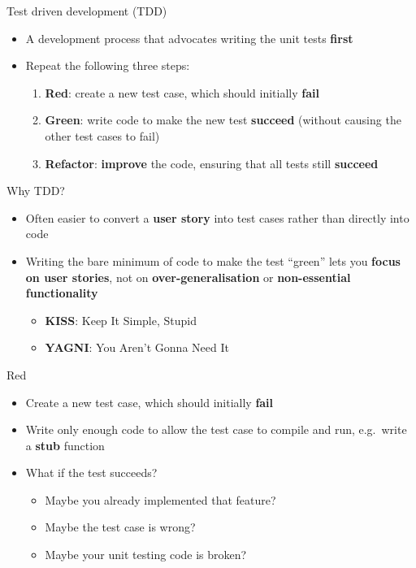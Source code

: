 \begin{frame}{Test driven development (TDD)}
    \begin{itemize}
        \item A development process that advocates writing the unit tests \textbf{first} \pause
        \item Repeat the following three steps: \pause
            \begin{enumerate}
                \item \textbf{Red}: create a new test case, which should initially \textbf{fail} \pause
                \item \textbf{Green}: write code to make the new test \textbf{succeed} (without causing the other test cases to fail) \pause
                \item \textbf{Refactor}: \textbf{improve} the code, ensuring that all tests still \textbf{succeed}
            \end{enumerate}
    \end{itemize}
\end{frame}

\begin{frame}{Why TDD?}
    \begin{itemize}
        \item Often easier to convert a \textbf{user story} into test cases rather than directly into code \pause
        \item Writing the bare minimum of code to make the test ``green''
            lets you \textbf{focus on user stories}, not on \textbf{over-generalisation} or \textbf{non-essential functionality} \pause
            \begin{itemize}
                \item \textbf{KISS}: Keep It Simple, Stupid
                \item \textbf{YAGNI}: You Aren't Gonna Need It
            \end{itemize}
    \end{itemize}
\end{frame}

\begin{frame}{Red}
    \begin{itemize}
        \item Create a new test case, which should initially \textbf{fail} \pause
        \item Write only enough code to allow the test case to compile and run,
            e.g.\ write a \textbf{stub} function \pause
        \item What if the test succeeds? \pause
            \begin{itemize}
                \item Maybe you already implemented that feature? \pause
                \item Maybe the test case is wrong? \pause
                \item Maybe your unit testing code is broken?
            \end{itemize}
    \end{itemize}
\end{frame}

